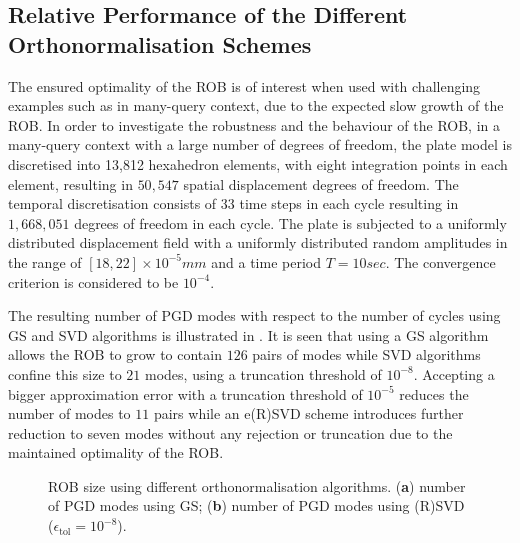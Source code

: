 \subsection{Relative Performance of the Different Orthonormalisation Schemes}
\label{sec_svd_results}

The ensured optimality of the ROB is of interest when used with challenging examples such as in many-query context, due to the expected slow growth of the ROB. In order to investigate the robustness and the behaviour of the ROB, in a many-query context with a large number of degrees of freedom, the plate model is discretised into 13,812 hexahedron elements, with eight integration points in each element, resulting in $50,547$ spatial displacement degrees of freedom. The temporal discretisation consists of $33$ time step{s} in each cycle resulting in $1,668,051$ degrees of freedom in each cycle. The plate is subjected to a uniformly distributed displacement field with a uniformly distributed random amplitudes in the range of $[18,22]\times 10^{-5} \unit{mm}$ and a time period $T = 10 \unit{sec}$. The convergence criterion is considered to be $10^{-4}$.

The resulting number of PGD modes with respect to the number of cycles using GS and SVD algorithms is illustrated in . It is seen that using a GS algorithm allows the ROB to grow to contain $126$ pairs of modes while SVD algorithms confine this size to $21$ modes, using a truncation threshold of $10^{-8}$. Accepting a bigger approximation error with a truncation threshold of $10^{-5}$ reduces the number of modes to $11$ pairs while an e(R)SVD scheme introduces further reduction to seven modes without any rejection or truncation due to the maintained optimality of the ROB.

\begin{figure}[hbt!]
	\centering
	\begin{subfigure}[t]{0.49\linewidth}
		
		\caption{}
	\end{subfigure}
	\hfil
	\begin{subfigure}[t]{0.49\linewidth}
		
		\caption{}
	\end{subfigure}
	\caption{ROB size using different orthonormalisation algorithms. (\textbf{a}) number of PGD modes using GS; (\textbf{b}) number of PGD modes using (R)SVD ($\epsilon_{\mathrm{tol}}=10^{-8}$).}
	\label{fig_100cycles_number_of_modes_1}
\end{figure}


